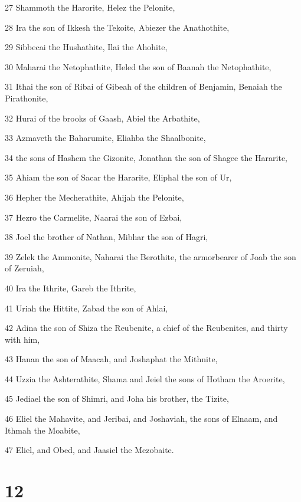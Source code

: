 \par 27 Shammoth the Harorite, Helez the Pelonite,
\par 28 Ira the son of Ikkesh the Tekoite, Abiezer the Anathothite,
\par 29 Sibbecai the Hushathite, Ilai the Ahohite,
\par 30 Maharai the Netophathite, Heled the son of Baanah the Netophathite,
\par 31 Ithai the son of Ribai of Gibeah of the children of Benjamin, Benaiah the Pirathonite,
\par 32 Hurai of the brooks of Gaash, Abiel the Arbathite,
\par 33 Azmaveth the Baharumite, Eliahba the Shaalbonite,
\par 34 the sons of Hashem the Gizonite, Jonathan the son of Shagee the Hararite,
\par 35 Ahiam the son of Sacar the Hararite, Eliphal the son of Ur,
\par 36 Hepher the Mecherathite, Ahijah the Pelonite,
\par 37 Hezro the Carmelite, Naarai the son of Ezbai,
\par 38 Joel the brother of Nathan, Mibhar the son of Hagri,
\par 39 Zelek the Ammonite, Naharai the Berothite, the armorbearer of Joab the son of Zeruiah,
\par 40 Ira the Ithrite, Gareb the Ithrite,
\par 41 Uriah the Hittite, Zabad the son of Ahlai,
\par 42 Adina the son of Shiza the Reubenite, a chief of the Reubenites, and thirty with him,
\par 43 Hanan the son of Maacah, and Joshaphat the Mithnite,
\par 44 Uzzia the Ashterathite, Shama and Jeiel the sons of Hotham the Aroerite,
\par 45 Jediael the son of Shimri, and Joha his brother, the Tizite,
\par 46 Eliel the Mahavite, and Jeribai, and Joshaviah, the sons of Elnaam, and Ithmah the Moabite,
\par 47 Eliel, and Obed, and Jaasiel the Mezobaite.

\chapter{12}

